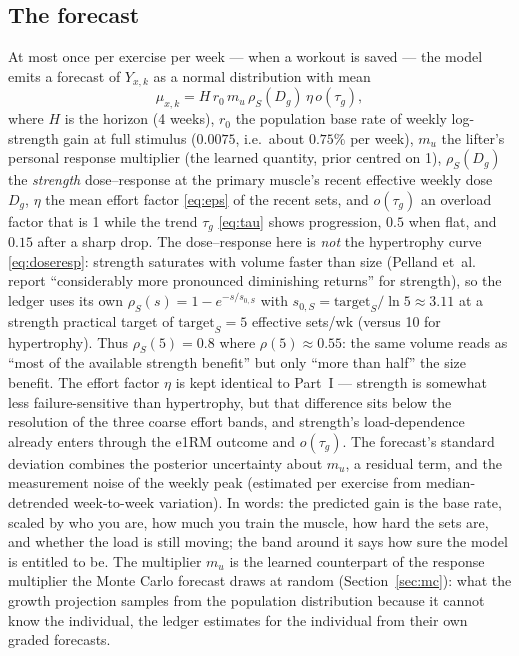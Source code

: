 \documentclass[11pt,a4paper]{article}
\begin{document}
\subsection{The forecast}
At most once per exercise per week --- when a workout is saved --- the model emits a forecast of $Y_{x,k}$ as a normal distribution with mean
\begin{equation}\label{eq:ledgermu}
\mu_{x,k}=H\, r_0\, m_u\, \rho_S(D_g)\, \eta\, o(\tau_g),
\end{equation}
where $H$ is the horizon (4 weeks), $r_0$ the population base rate of weekly log-strength gain at full stimulus ($0.0075$, i.e.\ about $0.75\%$ per week), $m_u$ the lifter's personal response multiplier (the learned quantity, prior centred on 1), $\rho_S(D_g)$ the \emph{strength} dose--response at the primary muscle's recent effective weekly dose $D_g$, $\eta$ the mean effort factor \eqref{eq:eps} of the recent sets, and $o(\tau_g)$ an overload factor that is 1 while the trend $\tau_g$ \eqref{eq:tau} shows progression, $0.5$ when flat, and $0.15$ after a sharp drop. The dose--response here is \emph{not} the hypertrophy curve \eqref{eq:doseresp}: strength saturates with volume faster than size (Pelland et~al.~\cite{drr} report ``considerably more pronounced diminishing returns'' for strength), so the ledger uses its own $\rho_S(s)=1-e^{-s/s_{0,S}}$ with $s_{0,S}=\text{target}_S/\ln 5\approx3.11$ at a strength practical target of $\text{target}_S=5$ effective sets/wk (versus 10 for hypertrophy). Thus $\rho_S(5)=0.8$ where $\rho(5)\approx0.55$: the same volume reads as ``most of the available strength benefit'' but only ``more than half'' the size benefit. The effort factor $\eta$ is kept identical to Part~I --- strength is somewhat less failure-sensitive than hypertrophy, but that difference sits below the resolution of the three coarse effort bands, and strength's load-dependence already enters through the e1RM outcome and $o(\tau_g)$. The forecast's standard deviation combines the posterior uncertainty about $m_u$, a residual term, and the measurement noise of the weekly peak (estimated per exercise from median-detrended week-to-week variation). In words: the predicted gain is the base rate, scaled by who you are, how much you train the muscle, how hard the sets are, and whether the load is still moving; the band around it says how sure the model is entitled to be. The multiplier $m_u$ is the learned counterpart of the response multiplier the Monte Carlo forecast draws at random (Section~\ref{sec:mc}): what the growth projection samples from the population distribution because it cannot know the individual, the ledger estimates for the individual from their own graded forecasts.
\end{document}
